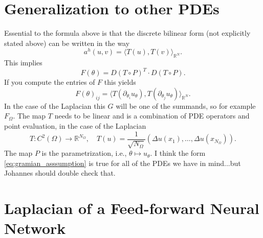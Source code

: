 \documentclass[11pt]{article}
\theoremstyle{definition}
\theoremstyle{plain}
\begin{document}
\section{Generalization to other PDEs}
Essential to the formula above is that the discrete bilinear form (not explicitly stated above) can be written in the way
\begin{equation}\label{eq:gramian_asssumption}
  a^h(u,v)
  =
  \langle T(u), T(v) \rangle_{\mathbb R^N}.
\end{equation}
This implies
\begin{equation*}
  F(\theta) = D(T\circ P)^T \cdot D(T \circ P).
\end{equation*}
If you compute the entries of $F$ this yields
\begin{equation*}
  F(\theta)_{ij} = \langle T(\partial_{\theta_i}u_\theta), T(\partial_{\theta_j}u_\theta) \rangle_{\mathbb R^N}.
\end{equation*}
In the case of the Laplacian this $G$ will be one of the summands, so for example $F_\Omega$.
The map $T$ needs to be linear and is a combination of PDE operators and point evaluation, in the case of the Laplacian
\begin{equation*}
  T:C^2(\Omega) \to \mathbb R^{N_\Omega}, \quad T(u) = \frac{1}{\sqrt{N_{\Omega}}}(\Delta u(x_1), \dots, \Delta u(x_{N_{\Omega}})).
\end{equation*}
The map $P$ is the parametrization, i.e., $\theta\mapsto u_\theta$.
I think the form \eqref{eq:gramian_asssumption} is true for all of the PDEs we have in mind...but Johannes should double check that.

\section{Laplacian of a Feed-forward Neural Network}

\end{document}
